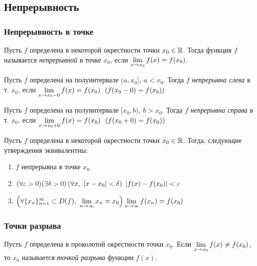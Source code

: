 \subsection{Непрерывность}

\subsubsection*{Непрерывность в точке}

\begin{definition}
	Пусть $f$ определена в некоторой окрестности
	точки $x_0 \in \mathbb{R}$. Тогда функция $f$ называется
	\textit{непрерывной} в точке $x_0$, если
	$\lim\limits_{x \to x_0} f(x) = f(x_0)$.
\end{definition}

\begin{definition}
	Пусть $f$ определена на полуинтервале $(a, x_0],\ a < x_0$.
	Тогда $f$ \textit{непрерывна слева} в т. $x_0$, если
	$\liml_{x \to x_0 - 0} f(x) = f(x_0) \ \ (f(x_0 - 0) = f(x_0))$
\end{definition}

\begin{definition}
	Пусть $f$ определена на полуинтервале $[x_0, b),\ b > x_0$.
	Тогда $f$ \textit{непрерывна справа} в т. $x_0$, если
	$\liml_{x \to x_0 + 0} f(x) = f(x_0) \ \ (f(x_0 + 0) = f(x_0))$
\end{definition}

\begin{theorem}
	Пусть $f$ определена в некоторой окрестности
	точки $x_0 \in \mathbb{R}$. Тогда, следующие утверждения эквивалентны:
	\begin{enumerate}
		\item $f$ непрерывна в точке $x_0$
		\item $(\forall \varepsilon > 0)(\exists \delta > 0)\left(\forall x,\ |x - x_0| < \delta\right)
	    	\ |f(x) - f(x_0)| < \varepsilon$
		\item $\left(\forall \{x_n\}_{n = 1}^\infty \subset D(f),\ \lim\limits_{n \to \infty} x_n = x_0\right) \lim\limits_{n \to \infty} f(x_n) = f(x_0)$
	\end{enumerate}
\end{theorem}

\subsubsection*{Точки разрыва}

\begin{definition}
	Пусть $f$ определена в проколотой окрестности точки $x_0$.
	Если $\lim\limits_{x \to x_0} f(x) \neq f(x_0)$,
	то $x_0$ называется \textit{точкой разрыва} функции $f(x)$.
\end{definition}

